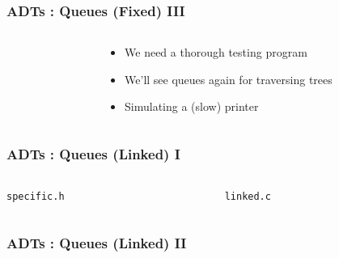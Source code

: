 
\begin{frame}[fragile]
\frametitle{ADTs : Queues (Fixed) III}
\begin{columns}[T]

\begin{column}{0.45\textwidth}

\end{column}

\pause
\begin{column}{0.30\textwidth}
\begin{itemize}[<+->]
\item We need a thorough testing program
\item We'll see queues again for traversing trees
\item Simulating a (slow) printer
\end{itemize}
\end{column}

\end{columns}
\end{frame}


\begin{frame}[fragile]
\frametitle{ADTs : Queues (Linked) I}
\begin{columns}[T]

\begin{column}{0.45\textwidth}
\verb^specific.h^

\end{column}

\pause
\begin{column}{0.45\textwidth}
\verb^linked.c^

\end{column}

\end{columns}
\end{frame}


\begin{frame}[fragile]
\frametitle{ADTs : Queues (Linked) II}
\begin{columns}[T]

\begin{column}{0.45\textwidth}

\end{column}

\pause
\begin{column}{0.45\textwidth}

\end{column}

\end{columns}
\end{frame}

